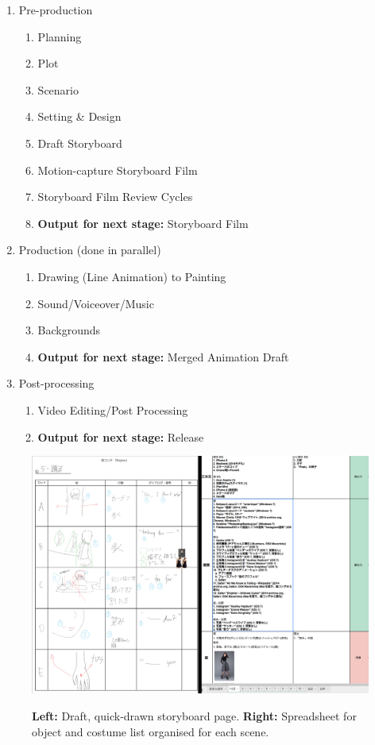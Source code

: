 \begin{enumerate}
    \item Pre-production
    \begin{enumerate}[label*=\arabic*.]
        \item Planning
        \item Plot
        \item Scenario
        \item Setting \& Design
        \item Draft Storyboard
        \item Motion-capture Storyboard Film
        \item Storyboard Film Review Cycles
        \item \textbf{Output for next stage:} Storyboard Film
    \end{enumerate}
    \item Production (done in parallel)
    \begin{enumerate}[label*=\arabic*.]
        \item Drawing (Line Animation) to Painting
        \item Sound/Voiceover/Music
        \item Backgrounds
        \item \textbf{Output for next stage:} Merged Animation Draft
    \end{enumerate}
    \item Post-processing
    \begin{enumerate}[label*=\arabic*.]
        \item Video Editing/Post Processing
        \item \textbf{Output for next stage:} Release
    \end{enumerate}
\end{enumerate}

\begin{figure}[t]
    \centering
    \includegraphics[width=1\linewidth]{img/results/storyboard.pdf} \\
    \caption{\textbf{Left:} Draft, quick-drawn storyboard page. \textbf{Right:} Spreadsheet for object and costume list organised for each scene.}
    \vspace{-15pt}
    \label{fig:storyboard}
\end{figure}

